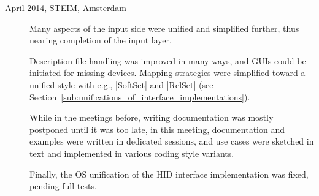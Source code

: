 \documentclass{article}
\begin{document}
\begin{description}
		
		
	\item[April 2014, STEIM, Amsterdam] 
	Many aspects of the input side were unified and simplified further, thus nearing completion of the input layer.

	Description file handling was improved in many ways, and GUIs could be initiated for missing devices. 
	Mapping strategies were simplified toward a unified style with e.g., |SoftSet| and |RelSet| (see Section~\ref{sub:unifications_of_interface_implementations}).

	While in the meetings before, writing documentation was mostly postponed until it was too late, in this meeting,  documentation and examples were written in dedicated sessions, and use cases were sketched in text and implemented in various coding style variants.

	Finally, the OS unification of the HID interface implementation was fixed, pending full tests.



\end{description}
\end{document}
